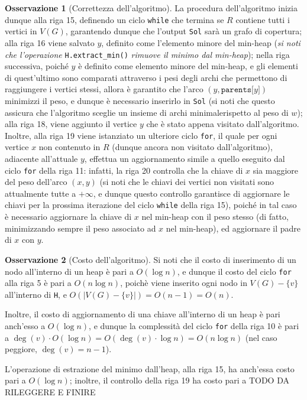 \documentclass[14pt]{extreport}
\theoremstyle{definition}
\theoremstyle{definition}
\newtheorem{remark}{Osservazione}[subsection]
\begin{document}
\begin{remark}[Correttezza dell'algoritmo]
    La procedura dell'algoritmo inizia dunque alla riga 15, definendo un ciclo \texttt{while} che termina se $R$ contiene tutti i vertici in $V(G)$, garantendo dunque che l'output \texttt{Sol} sarà un grafo di copertura; alla riga 16 viene salvato $y$, definito come l'elemento minore del min-heap (\textit{si noti che l'operazione} \texttt{H.extract\_min()} \textit{rimuove il minimo dal min-heap}); nella riga successiva, poiché $y$ è definito come elemento minore del min-heap, e gli elementi di quest'ultimo sono comparati attraverso i pesi degli archi che permettono di raggiungere i vertici stessi, allora è garantito che l'arco $(y, \texttt{parents[}y\texttt{]})$ minimizzi il peso, e dunque è necessario inserirlo in \texttt{Sol} (si noti che questo assicura che l'algoritmo sceglie un insieme di archi minimalerispetto al peso di $w$); alla riga 18, viene aggiunto il vertice $y$ che è stato appena visitato dall'algoritmo. Inoltre, alla riga 19 viene istanziato un ulteriore ciclo \texttt{for}, il quale per ogni vertice $x$ non contenuto in $R$ (dunque ancora non visitato dall'algoritmo), adiacente all'attuale $y$, effettua un aggiornamento simile a quello eseguito dal ciclo \texttt{for} della riga 11: infatti, la riga 20 controlla che la chiave di $x$ sia maggiore del peso dell'arco $(x, y)$ (si noti che le chiavi dei vertici non visitati sono attualmente tutte a $+ \infty$, e dunque questo controllo garantisce di aggiornare le chiavi per la prossima iterazione del ciclo \texttt{while} della riga 15), poiché in tal caso è necessario aggiornare la chiave di $x$ nel min-heap con il peso stesso (di fatto, minimizzando sempre il peso associato ad $x$ nel min-heap), ed aggiornare il padre di $x$ con $y$.
\end{remark}

\begin{remark}[Costo dell'algoritmo]
    Si noti che il costo di inserimento di un nodo all'interno di un heap è pari a $O(\log n)$, e dunque il costo del ciclo \texttt{for} alla riga 5 è pari a $O (n \log n)$, poichè viene inserito ogni nodo in $V(G) - \{v\}$ all'interno di \texttt{H}, e $O(|V(G) - \{v\}|) = O(n - 1) = O(n)$.

    Inoltre, il costo di aggiornamento di una chiave all'interno di un heap è pari anch'esso a $O(\log n)$, e dunque la complessità del ciclo \texttt{for} della riga 10 è pari a $\deg(v) \cdot O(\log n) = O(\deg(v) \cdot \log n) = O(n \log n)$ (nel caso peggiore, $\deg(v) = n - 1$).

    L'operazione di estrazione del minimo dall'heap, alla riga 15, ha anch'essa costo pari a $O(\log n)$; inoltre, il controllo della riga 19 ha costo pari a TODO DA RILEGGERE E FINIRE
\end{remark}
\end{document}

